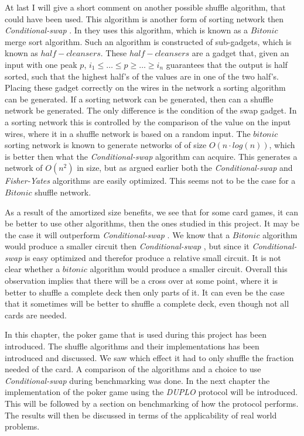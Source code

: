 \documentclass[twoside,11pt,openright]{report}
\newcommand{\FY}{\textit{Fisher-Yates} }
\newcommand{\CS}{\textit{Conditional-swap} }
\newcommand{\DUPLO}{\textit{DUPLO} }
\begin{document}
At last I will give a short comment on another possible shuffle algorithm, that could have been used. This algorithm is another form of sorting network then \CS. In \cite{psi} they uses this algorithm, which is known as a $Bitonic$ merge sort algorithm. Such an algorithm is constructed of sub-gadgets, which is known as $half-cleansers$. These $half-cleansers$ are a gadget that, given an input with one peak $p$, $i_1\leq \dots \leq p \geq \dots \geq i_n$ guarantees that the output is half sorted, such that the highest half's of the values are in one of the two half's. Placing these gadget correctly on the wires in the network a sorting algorithm can be generated. If a sorting network can be generated, then can a shuffle network be generated. The only difference is the condition of the swap gadget. In a sorting network this is controlled by the comparison of the value on the input wires, where it in a shuffle network is based on a random input. The $bitonic$ sorting network is known to generate networks of of size $O(n\cdot log(n))$, which is better then what the \CS algorithm can acquire. This generates a network of $O(n^2)$ in size, but as argued earlier both the \CS and \FY algorithms are easily optimized. This seems not to be the case for a $Bitonic$ shuffle network.

As a result of the amortized size benefits, we see that for some card games, it can be better to use other algorithms, then the ones studied in this project. It may be the case it will outperform \CS. We know that a $Bitonic$ algorithm would produce a smaller circuit then \CS, but since it \CS is easy optimized and therefor produce a relative small circuit. It is not clear whether a $bitonic$ algorithm would produce a smaller circuit. Overall this observation implies that there will be a cross over at some point, where it is better to shuffle a complete deck then only parts of it. It can even be the case that it sometimes will be better to shuffle a complete deck, even though not all cards are needed.

\bigskip

In this chapter, the poker game that is used during this project has been introduced. The shuffle algorithms and their implementations has been introduced and discussed. We saw which effect it had to only shuffle the fraction needed of the card. A comparison of the algorithms and a choice to use \CS during benchmarking was done. In the next chapter the implementation of the poker game using the \DUPLO protocol will be introduced. This will be followed by a section on benchmarking of how the protocol performs. The results will then be discussed in terms of the applicability of real world problems.
\end{document}
